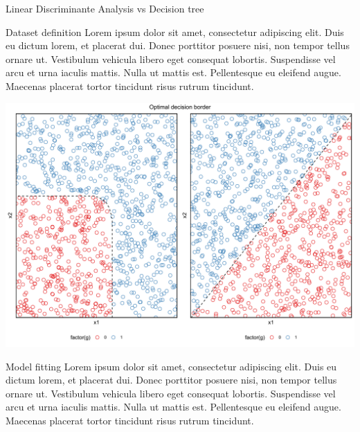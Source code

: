 \documentclass[
  ignorenonframetext,
]{article}
\newenvironment{Shaded}{\begin{snugshade}}{\end{snugshade}}
\newcommand{\CommentTok}[1]{\textcolor[rgb]{0.56,0.35,0.01}{\textit{#1}}}
\newcommand{\FunctionTok}[1]{\textcolor[rgb]{0.00,0.00,0.00}{#1}}
\newcommand{\NormalTok}[1]{#1}
\newcommand{\OtherTok}[1]{\textcolor[rgb]{0.56,0.35,0.01}{#1}}
\newcommand{\SpecialCharTok}[1]{\textcolor[rgb]{0.00,0.00,0.00}{#1}}
\begin{document}
\begin{frame}[fragile]{Linear Discriminante Analysis vs Decision tree}
\protect\hypertarget{linear-discriminante-analysis-vs-decision-tree}{}
\begin{block}{Dataset definition}
\protect\hypertarget{dataset-definition-1}{}
Lorem ipsum dolor sit amet, consectetur adipiscing elit. Duis eu dictum lorem, et placerat dui. Donec porttitor posuere nisi, non tempor tellus ornare ut. Vestibulum vehicula libero eget consequat lobortis. Suspendisse vel arcu et urna iaculis mattis. Nulla ut mattis est. Pellentesque eu eleifend augue. Maecenas placerat tortor tincidunt risus rutrum tincidunt.

\begin{center}\includegraphics{_main_files/figure-beamer/unnamed-chunk-20-1} \end{center}
\end{block}

\begin{block}{Model fitting}
\protect\hypertarget{model-fitting-1}{}
Lorem ipsum dolor sit amet, consectetur adipiscing elit. Duis eu dictum lorem, et placerat dui. Donec porttitor posuere nisi, non tempor tellus ornare ut. Vestibulum vehicula libero eget consequat lobortis. Suspendisse vel arcu et urna iaculis mattis. Nulla ut mattis est. Pellentesque eu eleifend augue. Maecenas placerat tortor tincidunt risus rutrum tincidunt.

\begin{Shaded}
\end{Shaded}
\end{block}
\end{frame}
\end{document}
